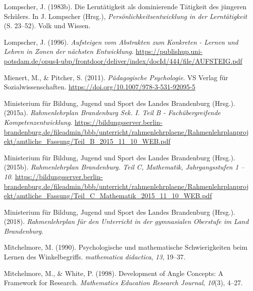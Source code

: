 \documentclass[
]{scrbook}
\newlength{\cslhangindent}
\newlength{\cslentryspacingunit} %
\newenvironment{CSLReferences}[2] %
 {%
  \setlength{\parindent}{0pt}
  \ifodd #1
  \let\oldpar\par
  \def\par{\hangindent=\cslhangindent\oldpar}
  \fi
  \setlength{\parskip}{#2\cslentryspacingunit}
 }%
 {}
\theoremstyle{definition}
\theoremstyle{definition}
\theoremstyle{definition}
\theoremstyle{definition}
\theoremstyle{remark}
\begin{document}
\begin{CSLReferences}{1}{0}
\leavevmode{}%
Lompscher, J. (1983b). Die {Lerntätigkeit} als dominierende {Tätigkeit} des jüngeren {Schülers}. In J. Lompscher (Hrsg.), \emph{Persönlichkeitsentwicklung in der {Lerntätigkeit}} (S. 23--52). Volk und Wissen.

\leavevmode{}%
Lompscher, J. (1996). \emph{Aufsteigen vom {Abstrakten} zum {Konkreten} - {Lernen} und {Lehren} in {Zonen} der nächsten {Entwicklung}}. \url{https://publishup.uni-potsdam.de/opus4-ubp/frontdoor/deliver/index/docId/444/file/AUFSTEIG.pdf}

\leavevmode{}%
Mienert, M., \& Pitcher, S. (2011). \emph{Pädagogische {Psychologie}}. VS Verlag für Sozialwissenschaften. \url{https://doi.org/10.1007/978-3-531-92095-5}

\leavevmode{}%
Ministerium für Bildung, Jugend und Sport des Landes Brandenburg (Hrsg.). (2015a). \emph{Rahmenlehrplan {Brandenburg} {Sek}. {I}. {Teil} {B} - {Fachübergreifende} {Kompetenzentwicklung}}. \url{https://bildungsserver.berlin-brandenburg.de/fileadmin/bbb/unterricht/rahmenlehrplaene/Rahmenlehrplanprojekt/amtliche_Fassung/Teil_B_2015_11_10_WEB.pdf}

\leavevmode{}%
Ministerium für Bildung, Jugend und Sport des Landes Brandenburg (Hrsg.). (2015b). \emph{Rahmenlehrplan Brandenburg. Teil C, Mathematik, Jahrgangsstufen 1 -- 10}. \url{https://bildungsserver.berlin-brandenburg.de/fileadmin/bbb/unterricht/rahmenlehrplaene/Rahmenlehrplanprojekt/amtliche_Fassung/Teil_C_Mathematik_2015_11_10_WEB.pdf}

\leavevmode{}%
Ministerium für Bildung, Jugend und Sport des Landes Brandenburg (Hrsg.). (2018). \emph{Rahmenlehrplan für den {Unterricht} in der gymnasialen {Oberstufe} im {Land} {Brandenburg}}.

\leavevmode{}%
Mitchelmore, M. (1990). Psychologische und mathematische Schwierigkeiten beim Lernen des Winkelbegriffs. \emph{mathematica didactica}, \emph{13}, 19--37.

\leavevmode{}%
Mitchelmore, M., \& White, P. (1998). Development of {Angle} {Concepts}: {A} {Framework} for {Research}. \emph{Mathematics Education Research Journal}, \emph{10}(3), 4--27.


\end{CSLReferences}
\end{document}
